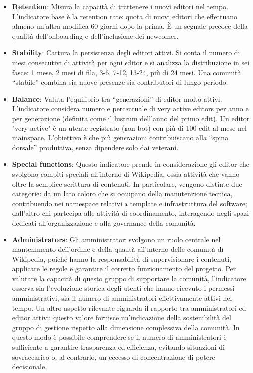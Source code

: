\begin{itemize}
    \item \textbf{Retention}: Misura la capacità di trattenere i nuovi editori nel tempo. L’indicatore base è la retention rate: quota di nuovi editori che effettuano almeno un’altra modifica 60 giorni dopo la prima. È un segnale precoce della qualità dell’onboarding e dell’inclusione dei newcomer.
    \item \textbf{Stability}: Cattura la persistenza degli editori attivi. Si conta il numero di mesi consecutivi di attività per ogni editor e si analizza la distribuzione in sei fasce: 1 mese, 2 mesi di fila, 3-6, 7-12, 13-24, più di 24 mesi. Una comunità “stabile” combina sia nuove presenze sia contributori di lungo periodo.
    \item \textbf{Balance}: Valuta l’equilibrio tra “generazioni” di editor molto attivi. L’indicatore considera numero e percentuale di very active editors per anno e per generazione (definita come il lustrum dell’anno del primo edit). Un editor "very active" è un utente registrato (non bot) con più di 100 edit al mese nel mainspace. L’obiettivo è che più generazioni contribuiscano alla “spina dorsale” produttiva, senza dipendere solo dai veterani.
    \item \textbf{Special functions}: Questo indicatore prende in considerazione gli editor che svolgono compiti speciali all’interno di Wikipedia, ossia attività che vanno oltre la semplice scrittura di contenuti. In particolare, vengono distinte due categorie: da un lato coloro che si occupano della manutenzione tecnica, contribuendo nei namespace relativi a template e infrastruttura del software; dall’altro chi partecipa alle attività di coordinamento, interagendo negli spazi dedicati all’organizzazione e alla governance della comunità.
    \item \textbf{Administrators}: Gli amministratori svolgono un ruolo centrale nel mantenimento dell’ordine e della qualità all’interno delle comunità di Wikipedia, poiché hanno la responsabilità di supervisionare i contenuti, applicare le regole e garantire il corretto funzionamento del progetto. Per valutare la capacità di questo gruppo di supportare la comunità, l’indicatore osserva sia l’evoluzione storica degli utenti che hanno ricevuto i permessi amministrativi, sia il numero di amministratori effettivamente attivi nel tempo. Un altro aspetto rilevante riguarda il rapporto tra amministratori ed editor attivi: questo valore fornisce un’indicazione della sostenibilità del gruppo di gestione rispetto alla dimensione complessiva della comunità. In questo modo è possibile comprendere se il numero di amministratori è sufficiente a garantire trasparenza ed efficienza, evitando situazioni di sovraccarico o, al contrario, un eccesso di concentrazione di potere decisionale.

\end{itemize}
